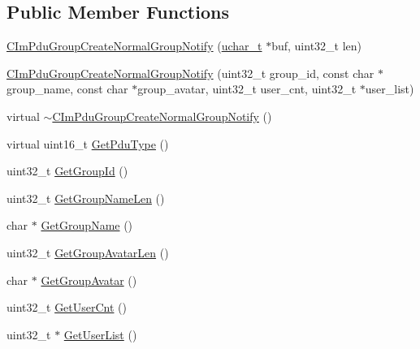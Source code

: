 \subsection*{Public Member Functions}
\begin{DoxyCompactItemize}
\item 
\hyperlink{class_c_im_pdu_group_create_normal_group_notify_a4c9cfacf809aa8cb13e191691ab2d55b}{C\+Im\+Pdu\+Group\+Create\+Normal\+Group\+Notify} (\hyperlink{base_2ostype_8h_a124ea0f8f4a23a0a286b5582137f0b8d}{uchar\+\_\+t} $\ast$buf, uint32\+\_\+t len)
\item 
\hyperlink{class_c_im_pdu_group_create_normal_group_notify_ac51bd9a3170b59d6ca379df1ae37ff54}{C\+Im\+Pdu\+Group\+Create\+Normal\+Group\+Notify} (uint32\+\_\+t group\+\_\+id, const char $\ast$group\+\_\+name, const char $\ast$group\+\_\+avatar, uint32\+\_\+t user\+\_\+cnt, uint32\+\_\+t $\ast$user\+\_\+list)
\item 
virtual \hyperlink{class_c_im_pdu_group_create_normal_group_notify_a0a39e280b7a605be013ab33eb36c28fa}{$\sim$\+C\+Im\+Pdu\+Group\+Create\+Normal\+Group\+Notify} ()
\item 
virtual uint16\+\_\+t \hyperlink{class_c_im_pdu_group_create_normal_group_notify_aee2b659cbea450d23a67218e55cff2c0}{Get\+Pdu\+Type} ()
\item 
uint32\+\_\+t \hyperlink{class_c_im_pdu_group_create_normal_group_notify_a5dd6151633258cfd234e61ac07a11696}{Get\+Group\+Id} ()
\item 
uint32\+\_\+t \hyperlink{class_c_im_pdu_group_create_normal_group_notify_a3f9e22c4ffccc19dc776d92d38b50be4}{Get\+Group\+Name\+Len} ()
\item 
char $\ast$ \hyperlink{class_c_im_pdu_group_create_normal_group_notify_ad62bb1f166c7f10515fdfeed091c56b9}{Get\+Group\+Name} ()
\item 
uint32\+\_\+t \hyperlink{class_c_im_pdu_group_create_normal_group_notify_a168f600a443b5e8f402bf2c7448393df}{Get\+Group\+Avatar\+Len} ()
\item 
char $\ast$ \hyperlink{class_c_im_pdu_group_create_normal_group_notify_af60cde3ab04c503d0c7474797b6d905d}{Get\+Group\+Avatar} ()
\item 
uint32\+\_\+t \hyperlink{class_c_im_pdu_group_create_normal_group_notify_a9345393584ef3508305e8dfa549e5305}{Get\+User\+Cnt} ()
\item 
uint32\+\_\+t $\ast$ \hyperlink{class_c_im_pdu_group_create_normal_group_notify_a8190faf47ae2eaec84f3c3665ee8f117}{Get\+User\+List} ()
\end{DoxyCompactItemize}
